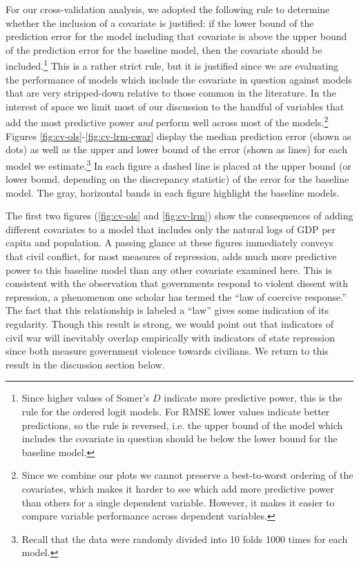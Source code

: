\documentclass[12pt]{article}
\begin{document}
For our cross-validation analysis, we adopted the following rule to determine whether the inclusion of a covariate is justified: if the lower bound of the prediction error for the model including that covariate is above the upper bound of the prediction error for the baseline model, then the covariate should be included.\footnote{Since higher values of Somer's $D$ indicate more predictive power, this is the rule for the ordered logit models. For RMSE lower values indicate better predictions, so the rule is reversed, i.e. the upper bound of the model which includes the covariate in question should be below the lower bound for the baseline model.} This is a rather strict rule, but it is justified since we are evaluating the performance of models which include the covariate in question against models that are very stripped-down relative to those common in the literature. In the interest of space we limit most of our discussion to the handful of variables that add the most predictive power {\em and} perform well across most of the models.\footnote{Since we combine our plots we cannot preserve a best-to-worst ordering of the covariates, which makes it harder to see which add more predictive power than others for a single dependent variable. However, it makes it easier to compare variable performance across dependent variables.} Figures \ref{fig:cv-ols}-\ref{fig:cv-lrm-cwar} display the median prediction error (shown as dots) as well as the upper and lower bound of the error (shown as lines) for each model we estimate.\footnote{Recall that the data were randomly divided into 10 folds 1000 times for each model.} In each figure a dashed line is placed at the upper bound (or lower bound, depending on the discrepancy statistic) of the error for the baseline model. The gray, horizontal bands in each figure highlight the baseline models. 

The first two figures (\ref{fig:cv-ols} and \ref{fig:cv-lrm}) show the consequences of adding different covariates to a model that includes only the natural logs of GDP per capita and population. A passing glance at these figures immediately conveys that civil conflict, for most measures of repression, adds much more predictive power to this baseline model than any other covariate examined here. This is consistent with the observation that governments respond to violent dissent with repression, a phenomenon one scholar \citep{Davenport2007AR} has termed the ``law of coercive response.'' The fact that this relationship is labeled a ``law'' gives some indication of its regularity. Though this result is strong, we would point out that indicators of civil war will inevitably overlap empirically with indicators of state repression since both measure government violence towards civilians. We return to this result in the discussion section below. 
\end{document}
